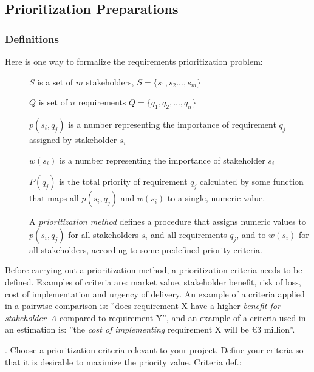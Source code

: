 \documentclass[11pt]{article}
\begin{document}
\subsection{Prioritization Preparations}

\subsubsection{Definitions}

Here is one way to formalize the requirements prioritization problem: 
\begin{description}
\item [] $S$ is a set of $m$ stakeholders, $S=\{s_1, s_2 ..., s_m\}$
\item [] $Q$ is set of $n$ requirements $Q=\{q_1, q_2, ..., q_n\}$
\item [] $p(s_i, q_j)$ is a number representing the importance of requirement $q_j$ assigned by stakeholder $s_i$
\item [] $w(s_i)$ is a number representing the importance of stakeholder $s_i$
\item [] $P(q_j)$ is the total priority of requirement $q_j$ calculated by some function that maps all $p(s_i, q_j)$ and $w(s_i)$ to a single, numeric value.
\item[] A {\it prioritization method} defines a procedure that assigns numeric values to $p(s_i, q_j)$ for all stakeholders $s_i$ and all requirements $q_j$, and to $w(s_i)$ for all stakeholders, according to some predefined priority criteria.  
\end{description}

\noindent Before carrying out a prioritization method, a prioritization criteria needs to be defined. Examples of criteria are: market value, stakeholder benefit, risk of loss, cost of implementation and urgency of delivery. An example of a criteria applied in a pairwise comparison is: ''does requirement X have a higher {\it benefit for stakeholder~A} compared to requirement Y'', and an example of a criteria used in an estimation is: ''the {\it cost of implementing} requirement X will be \euro 3 million''.

\begin{framed}
. Choose a prioritization criteria relevant to your project. Define your criteria so that it is desirable to maximize the priority value. 
\newline\newline Criteria def.: \underline{\hspace{10cm}}
 \end{framed}
 
\end{document}

